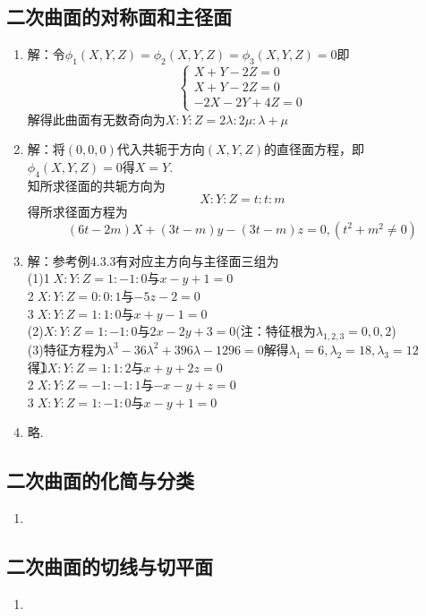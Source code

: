 \documentclass[UTF8]{ctexart}
\begin{document}
\subsection{二次曲面的对称面和主径面}
\begin{enumerate}

\item 解：令$\phi_1\left(X,Y,Z\right)=\phi_2\left(X,Y,Z\right)=\phi_3\left(X,Y,Z\right)=0$即
$$\left\{\begin{array}{l}X+Y-2Z=0\\X+Y-2Z=0\\-2X-2Y+4Z=0\end{array}\right.$$解得此曲面有无数奇向为$X:Y:Z=2\lambda:2\mu:\lambda+\mu$

\item 解：将$(0,0,0)$代入共轭于方向$(X,Y,Z)$的直径面方程，即$\phi_4(X,Y,Z)=0$得$X=Y$.\\
知所求径面的共轭方向为$$X:Y:Z=t:t:m$$
得所求径面方程为$$(6t-2m)X+(3t-m)y-(3t-m)z=0,(t^2+m^2\neq0)$$

\item 解：参考例4.3.3有对应主方向与主径面三组为\\
(1)\textcircled{1}$X:Y:Z=1:-1:0$与$x-y+1=0$\\
\textcircled{2}$X:Y:Z=0:0:1$与$-5z-2=0$\\
\textcircled{3}$X:Y:Z=1:1:0$与$x+y-1=0$\\
(2)$X:Y:Z=1:-1:0$与$2x-2y+3=0$(注：特征根为$\lambda_{1,2,3}=0,0,2$)\\
(3)特征方程为$\lambda^3-36\lambda^2+396\lambda-1296=0$解得$\lambda_1=6,\lambda_2=18,\lambda_3=12$\\
得\textcircled{1}$X:Y:Z=1:1:2$与$x+y+2z=0$\\
\textcircled{2}$X:Y:Z=-1:-1:1$与$-x-y+z=0$\\
\textcircled{3}$X:Y:Z=1:-1:0$与$x-y+1=0$\\

\item 略. 
\end{enumerate}

\subsection{二次曲面的化简与分类}
\begin{enumerate}

\item

\end{enumerate}

\subsection{二次曲面的切线与切平面}
\begin{enumerate}

\item

\end{enumerate}


\end{document}
